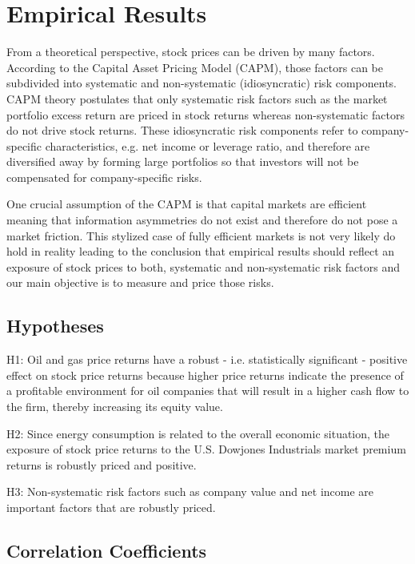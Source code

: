 \documentclass[a4paper]{article}
\begin{document}
\section{Empirical Results}

From a theoretical perspective, stock prices can be driven by many factors. According to the Capital Asset Pricing Model (CAPM), those factors can be subdivided into systematic and non-systematic (idiosyncratic) risk components. CAPM theory postulates that only systematic risk factors such as the market portfolio excess return are priced in stock returns whereas non-systematic factors do not drive stock returns. These idiosyncratic risk components refer to company-specific characteristics, e.g. net income or leverage ratio, and therefore are diversified away by forming large portfolios so that investors will not be compensated for company-specific risks.

One crucial assumption of the CAPM is that capital markets are efficient meaning that information asymmetries do not exist and therefore do not pose a market friction. This stylized case of fully efficient markets is not very likely do hold in reality leading to the conclusion that empirical results should reflect an exposure of stock prices to both, systematic and non-systematic risk factors and our main objective is to measure and price those risks.

\subsection{Hypotheses}

H1: Oil and gas price returns have a robust - i.e. statistically significant - positive effect on stock price returns because higher price returns indicate the presence of a profitable environment for oil companies that will result in a higher cash flow to the firm, thereby increasing its equity value.

H2: Since energy consumption is related to the overall economic situation, the exposure of stock price returns to the U.S. Dowjones Industrials market premium returns is robustly priced and positive.

H3: Non-systematic risk factors such as company value and net income are important factors that are robustly priced.

\subsection{Correlation Coefficients}
\end{document}
